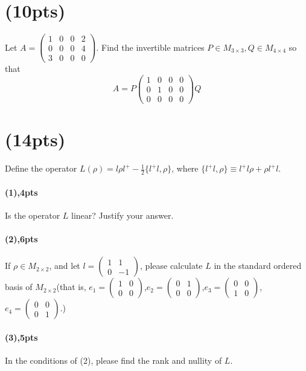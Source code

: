 \documentclass{article}
\begin{document}
\section{(10pts)}Let $A=\begin{pmatrix}
    1&0&0&2\\0&0&0&4\\3&0&0&0
\end{pmatrix}$.
Find the invertible matrices $P\in M_{3\times 3},Q\in M_{4\times 4}$ so that $$A=P\begin{pmatrix}
    1&0&0&0\\0&1&0&0\\0&0&0&0
\end{pmatrix}Q$$
\section{(14pts)}
Define the operator $L(\rho)=l\rho l^+-\frac{1}{2}\{l^+ l,\rho\}$, where $\{l^+ l,\rho\}\equiv l^+ l\rho+\rho l^+ l$.
\paragraph{(1),4pts}
Is the operator $L$ linear? Justify your answer.
\paragraph{(2),6pts}
If $\rho\in M_{2\times 2}$, and let $l=\begin{pmatrix}
    1&1\\0&-1
\end{pmatrix}$, please calculate $L$ in the standard ordered basis of $M_{2\times 2}$(that is, $e_1=\begin{pmatrix}
    1&0\\0&0
\end{pmatrix}$,$e_2=\begin{pmatrix}
    0&1\\0&0
\end{pmatrix}$,$e_3=\begin{pmatrix}
    0&0\\1&0
\end{pmatrix}$,$e_4=\begin{pmatrix}
    0&0\\0&1
\end{pmatrix}$.)
\paragraph{(3),5pts}
In the conditions of (2), please find the rank and nullity of $L$.
\end{document}
